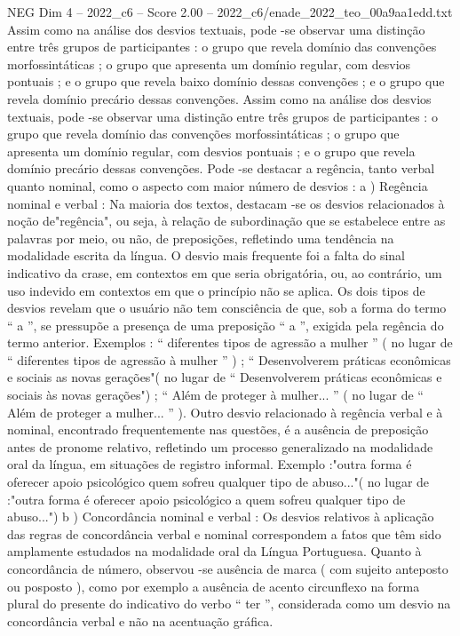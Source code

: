 \begin{textsample}{NEG Dim 4 – 2022\_c6 – Score 2.00 – 2022\_c6/enade\_2022\_teo\_00a9aa1edd.txt}
Assim como na análise dos desvios textuais, pode -se observar uma distinção entre três grupos de participantes : o grupo que revela domínio das convenções morfossintáticas ; o grupo que apresenta um domínio regular, com desvios pontuais ; e o grupo que revela baixo domínio dessas convenções ; e o grupo que revela domínio precário dessas convenções.
Assim como na análise dos desvios textuais, pode -se observar uma distinção entre três grupos de participantes : o grupo que revela domínio das convenções morfossintáticas ; o grupo que apresenta um domínio regular, com desvios pontuais ; e o grupo que revela domínio precário dessas convenções.
Pode -se destacar a regência, tanto verbal quanto nominal, como o aspecto com maior número de desvios : a ) Regência nominal e verbal : Na maioria dos textos, destacam -se os desvios relacionados à noção de"regência", ou seja, à relação de subordinação que se estabelece entre as palavras por meio, ou não, de preposições, refletindo uma tendência na modalidade escrita da língua.
O desvio mais frequente foi a falta do sinal indicativo da crase, em contextos em que seria obrigatória, ou, ao contrário, um uso indevido em contextos em que o princípio não se aplica.
Os dois tipos de desvios revelam que o usuário não tem consciência de que, sob a forma do termo “ a ”, se pressupõe a presença de uma preposição “ a ”, exigida pela regência do termo anterior.
Exemplos : “ diferentes tipos de agressão a mulher ” ( no lugar de “ diferentes tipos de agressão à mulher ” ) ; “ Desenvolverem práticas econômicas e sociais as novas gerações"( no lugar de “ Desenvolverem práticas econômicas e sociais às novas gerações") ; “ Além de proteger à mulher... ” ( no lugar de “ Além de proteger a mulher... ” ).
Outro desvio relacionado à regência verbal e à nominal, encontrado frequentemente nas questões, é a ausência de preposição antes de pronome relativo, refletindo um processo generalizado na modalidade oral da língua, em situações de registro informal.
Exemplo :"outra forma é oferecer apoio psicológico quem sofreu qualquer tipo de abuso..."( no lugar de :"outra forma é oferecer apoio psicológico a quem sofreu qualquer tipo de abuso...") b ) Concordância nominal e verbal : Os desvios relativos à aplicação das regras de concordância verbal e nominal correspondem a fatos que têm sido amplamente estudados na modalidade oral da Língua Portuguesa.
Quanto à concordância de número, observou -se ausência de marca ( com sujeito anteposto ou posposto ), como por exemplo a ausência de acento circunflexo na forma plural do presente do indicativo do verbo “ ter ”, considerada como um desvio na concordância verbal e não na acentuação gráfica.

\end{textsample}
